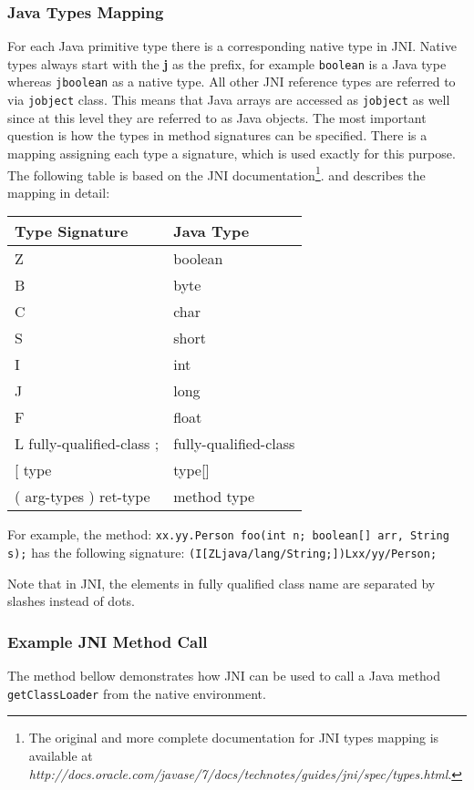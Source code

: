 \subsubsection{Java Types Mapping}
For each Java primitive type there is a corresponding native type in JNI. Native types always start with the \textbf{j} as the prefix, for example \texttt{boolean} is a Java type whereas \texttt{jboolean} as a native type.
All other JNI reference types are referred to via \texttt{jobject} class. This means that Java arrays are accessed as \texttt{jobject} as well since at this level they are referred to as Java objects. The most important question is how the types in method signatures can be specified. There is a mapping assigning each type a signature, which is used exactly for this purpose. The following table is based on the JNI documentation\footnote{The original and more complete documentation for JNI types mapping is available at \textit{http://docs.oracle.com/javase/7/docs/technotes/guides/jni/spec/types.html}.}. and describes the mapping in detail:
\begin{center}
\begin{tabular}{ l l }
	  \hline
	  Type Signature & Java Type \\ \hline
	Z & boolean \\
	B & byte \\
	C & char \\
	S & short \\
	I & int \\
	J & long \\
	F & float \\
	L fully-qualified-class ; & fully-qualified-class \\
	{[} type & type{[]}\ \\
	( arg-types ) ret-type & method type \\
\end{tabular}
\end{center}

For example, the method: \newline \texttt{xx.yy.Person foo(int n; boolean[] arr, String s);} has the following signature:
\texttt{(I[ZLjava/lang/String;])Lxx/yy/Person;}

Note that in JNI, the elements in fully qualified class name are separated by slashes instead of dots.
\subsubsection{Example JNI Method Call}
The method bellow demonstrates how JNI can be used to call a Java method \texttt{getClassLoader} from the native environment.

